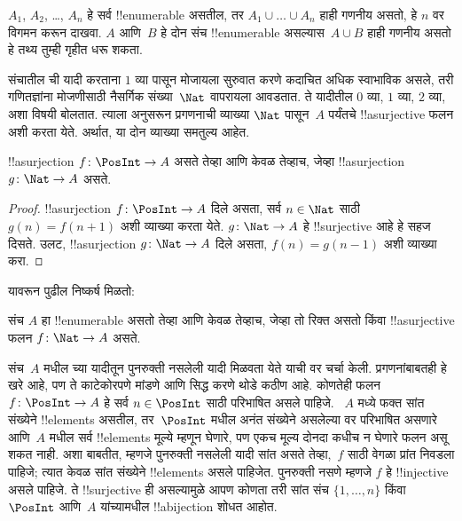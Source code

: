 \documentclass[../../../include/open-logic-section]{subfiles}
\begin{document}
\begin{prob}
  $A_1$, $A_2$, \dots, $A_n$ हे सर्व !!{enumerable} असतील, तर
  $A_1 \cup \dots \cup A_n$ हाही गणनीय असतो, हे
  $n$ वर विगमन करून दाखवा. $A$ आणि~$B$ हे दोन संच
  !!{enumerable} असल्यास~$A \cup B$ हाही गणनीय असतो
  हे तथ्य तुम्ही गृहीत धरू शकता.
\end{prob}

संचातील ची यादी करताना $1$ व्या पासून
मोजायला सुरुवात करणे कदाचित अधिक स्वाभाविक असले, तरी गणितज्ञांना
मोजणीसाठी नैसर्गिक संख्या~$\Nat$ वापरायला आवडतात. ते यादीतील
$0$ व्या, $1$ व्या, $2$ व्या, अशा विषयी बोलतात.
त्याला अनुसरून प्रगणनाची व्याख्या $\Nat$ पासून~$A$ पर्यंतचे
!!a{surjective} फलन अशी करता येते. अर्थात, या दोन व्याख्या समतुल्य आहेत.

\begin{prop}
  !!a{surjection} $f\colon \PosInt \to A$ असते तेव्हा आणि
  केवळ तेव्हाच, जेव्हा !!a{surjection} $g\colon \Nat \to A$ असते.
\end{prop}

\begin{proof}
  !!a{surjection} $f\colon \PosInt \to A$ दिले असता, सर्व
  $n \in \Nat$ साठी $g(n) = f(n+1)$ अशी व्याख्या करता येते.
  $g\colon \Nat \to A$ हे !!{surjective} आहे हे सहज दिसते.
  उलट, !!a{surjection} $g\colon \Nat \to A$ दिले असता,
  $f(n) = g(n-1)$ अशी व्याख्या करा.
\end{proof}

यावरून पुढील निष्कर्ष मिळतो:

\begin{cor}
संच $A$ हा !!{enumerable} असतो तेव्हा आणि केवळ तेव्हाच, जेव्हा
तो रिक्त असतो किंवा !!a{surjective} फलन $f\colon \Nat \to A$ असते.
\end{cor}

संच~$A$ मधील च्या यादीतून पुनरुक्ती नसलेली यादी
मिळवता येते याची वर चर्चा केली. प्रगणनांबाबतही हे खरे आहे,
पण ते काटेकोरपणे मांडणे आणि सिद्ध करणे थोडे कठीण आहे. कोणतेही
फलन $f\colon \PosInt \to A$ हे सर्व $n \in \PosInt$ साठी
परिभाषित असले पाहिजे. ~$A$ मध्ये फक्त सांत संख्येने !!{element}s
असतील, तर~$\PosInt$ मधील अनंत संख्येने असलेल्या वर
परिभाषित असणारे आणि~$A$ मधील सर्व !!{element}s मूल्ये म्हणून
घेणारे, पण एकच मूल्य दोनदा कधीच न घेणारे फलन असू शकत नाही.
अशा बाबतीत, म्हणजे पुनरुक्ती नसलेली यादी सांत असते तेव्हा,~$f$
साठी वेगळा प्रांत निवडला पाहिजे; त्यात केवळ सांत संख्येने
!!{element}s असले पाहिजेत. पुनरुक्ती नसणे म्हणजे $f$ हे
!!{injective} असले पाहिजे. ते !!{surjective} ही असल्यामुळे
आपण कोणता तरी सांत संच $\{1, \dots, n\}$ किंवा $\PosInt$
आणि~$A$ यांच्यामधील !!a{bijection} शोधत आहोत.
\end{document}
